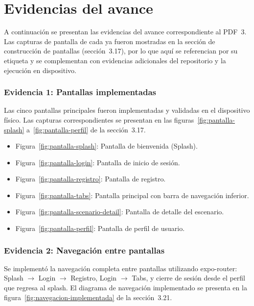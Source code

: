 
\section{Evidencias del avance}

A continuaci\'on se presentan las evidencias del avance correspondiente al
PDF~3. Las capturas de pantalla de cada ya fueron mostradas en la secci\'on de
construcci\'on de pantallas (secci\'on~3.17), por lo que aqu\'i se referencian
por su etiqueta y se complementan con evidencias adicionales del repositorio
y la ejecuci\'on en dispositivo.

\subsubsection*{Evidencia 1: Pantallas implementadas}

Las cinco pantallas principales fueron implementadas y validadas en el
dispositivo f\'isico. Las capturas correspondientes se presentan en las
figuras~\ref{fig:pantalla-splash} a~\ref{fig:pantalla-perfil} de la
secci\'on~3.17.

\begin{itemize}
  \item Figura~\ref{fig:pantalla-splash}: Pantalla de bienvenida (Splash).
  \item Figura~\ref{fig:pantalla-login}: Pantalla de inicio de sesi\'on.
  \item Figura~\ref{fig:pantalla-registro}: Pantalla de registro.
  \item Figura~\ref{fig:pantalla-tabs}: Pantalla principal con barra de
    navegaci\'on inferior.
  \item Figura~\ref{fig:pantalla-scenario-detail}: Pantalla de detalle del
    escenario.
  \item Figura~\ref{fig:pantalla-perfil}: Pantalla de perfil de usuario.
\end{itemize}

\subsubsection*{Evidencia 2: Navegaci\'on entre pantallas}

Se implement\'o la navegaci\'on completa entre pantallas utilizando
expo-router: Splash $\rightarrow$ Login $\rightarrow$ Registro, Login
$\rightarrow$ Tabs, y cierre de sesi\'on desde el perfil que regresa al
splash. El diagrama de navegaci\'on implementado se presenta en la
figura~\ref{fig:navegacion-implementada} de la secci\'on~3.21.

